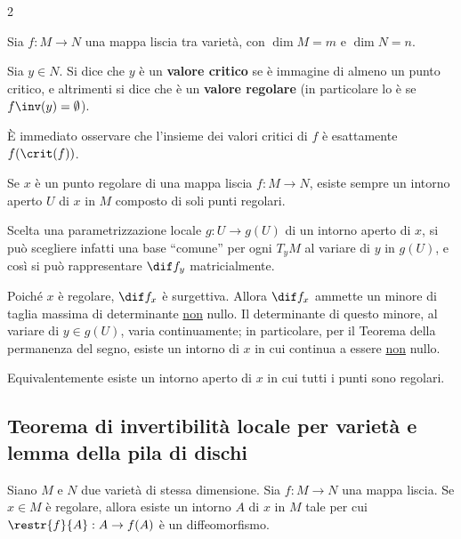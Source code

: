 \begin{multicols*}{2}
    \begin{definition}
        Sia $f : M \to N$ una mappa liscia tra varietà, con
        $\dim M = m$ e $\dim N = n$. \smallskip

        Sia $y \in N$. Si dice che $y$ è un \textbf{valore critico}
        se è immagine di almeno un punto critico, e altrimenti si dice che
        è un \textbf{valore regolare} (in particolare lo è se
        $f\inv(y) = \emptyset$).
    \end{definition}

    \begin{remark}
        È immediato osservare che l'insieme dei valori critici di
        $f$ è esattamente $f(\crit(f))$.
    \end{remark}

    \begin{remark} \label{rmk:punti_regolari_formano_aperto}
        Se $x$ è un punto regolare di una mappa liscia
        $f : M \to N$, esiste sempre un intorno aperto $U$
        di $x$ in $M$ composto di soli punti regolari. \smallskip

        Scelta una parametrizzazione locale $g : U \to g(U)$ di un intorno aperto di $x$,
        si può scegliere infatti una base ``comune'' per ogni $T_y M$ al
        variare di $y$ in $g(U)$, e così si può rappresentare
        $\dif f_y$ matricialmente. \smallskip

        Poiché $x$ è regolare, $\dif f_x$ è surgettiva. Allora
        $\dif f_x$ ammette un minore di taglia massima di
        determinante \underline{non} nullo. Il determinante di questo minore,
        al variare di $y \in g(U)$, varia continuamente; in particolare, per
        il Teorema della permanenza del segno, esiste un intorno di $x$
        in cui continua a essere \underline{non} nullo. \smallskip

        Equivalentemente esiste un intorno aperto di $x$ in cui tutti i punti
        sono regolari.
    \end{remark}

    \subsection{Teorema di invertibilità locale per varietà e lemma della pila di dischi}

    \begin{theorem} \label{thm:invertibilità_locale_varietà}
        Siano $M$ e $N$ due varietà di stessa dimensione. Sia
        $f : M \to N$ una mappa liscia. Se $x \in M$ è regolare,
        allora esiste un intorno $A$ di $x$ in $M$ tale per cui
        $\restr{f}{A} : A \to f(A)$ è un diffeomorfismo.
    \end{theorem}


\end{multicols*}
